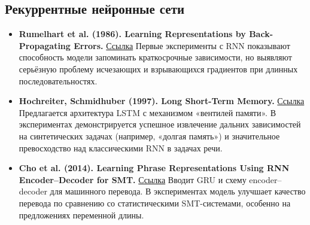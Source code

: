 \documentclass[12pt,a4paper]{article}
\begin{document}
\subsection{Рекуррентные нейронные сети}
\begin{itemize}
  \item \textbf{Rumelhart et al. (1986). Learning Representations by Back-Propagating Errors.}
  \href{https://www.nature.com/articles/323533a0}{Ссылка}
  Первые эксперименты с RNN показывают способность модели запоминать краткосрочные зависимости, но выявляют серьёзную проблему исчезающих и взрывающихся градиентов при длинных последовательностях.

  \item \textbf{Hochreiter, Schmidhuber (1997). Long Short-Term Memory.}
  \href{https://www.bioinf.jku.at/publications/older/2604.pdf}{Ссылка}
  Предлагается архитектура LSTM с механизмом «вентилей памяти». В экспериментах демонстрируется успешное извлечение дальних зависимостей на синтетических задачах (например, «долгая память») и значительное превосходство над классическими RNN в задачах речи.

  \item \textbf{Cho et al. (2014). Learning Phrase Representations Using RNN Encoder–Decoder for SMT.}
  \href{https://arxiv.org/abs/1406.1078}{Ссылка}
  Вводит GRU и схему encoder–decoder для машинного перевода. В экспериментах модель улучшает качество перевода по сравнению со статистическими SMT-системами, особенно на предложениях переменной длины.
\end{itemize}
\end{document}
